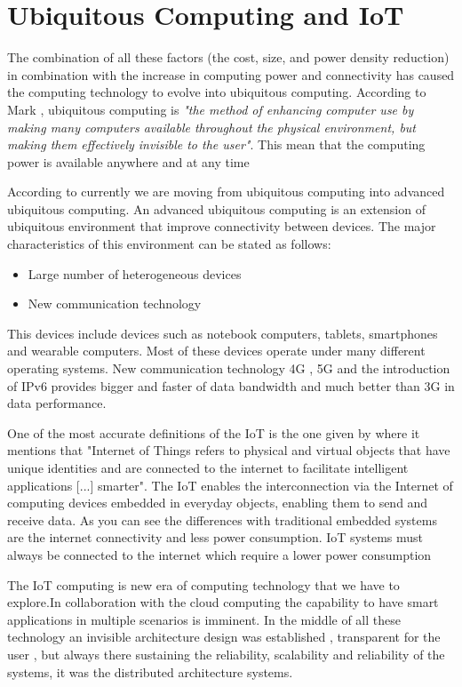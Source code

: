 \section{Ubiquitous Computing and IoT}
\noindent

The combination of all these factors (the cost, size, and power density
reduction) in combination with the increase in computing power and connectivity
has caused the computing technology to evolve into ubiquitous computing.
According to Mark \cite{Mark}, ubiquitous computing is \textit{"the method of
enhancing computer use by making many computers available throughout the
physical environment, but making them effectively invisible to the user"}. This
mean that the computing power is available anywhere and at any time


According to \cite{Nur} currently we are moving from ubiquitous computing into
advanced ubiquitous computing. An advanced ubiquitous computing is an extension
of ubiquitous environment that improve connectivity between devices. The major
characteristics of this environment can be stated as follows: 

\begin{itemize}
\item Large number of heterogeneous devices
\item New communication technology
\end{itemize}

This  devices include devices such as notebook computers, tablets, smartphones
and wearable computers. Most of these devices operate under many different
operating systems. New communication technology 4G , 5G and the introduction of
IPv6 provides bigger and faster of data bandwidth and much better than 3G in
data performance.

One of the most accurate definitions of the IoT is the one given by
\cite{Bahga} where it mentions that "Internet of Things refers to physical and
virtual objects that have unique identities and are connected to the internet
to facilitate intelligent applications [...] smarter". The IoT enables the
interconnection via the Internet of computing devices embedded in everyday
objects, enabling them to send and receive data. As you can see the differences
with traditional embedded systems are the internet connectivity and less power
consumption.  IoT systems must always be connected to the internet which
require a lower power consumption

The IoT computing is new era of computing technology that we have to explore.In
collaboration with the cloud computing the capability to have smart
applications in multiple scenarios is imminent. In the middle of all these
technology an invisible architecture design was established , transparent for
the user , but always there sustaining the reliability, scalability and
reliability of the systems, it was the distributed architecture systems.

